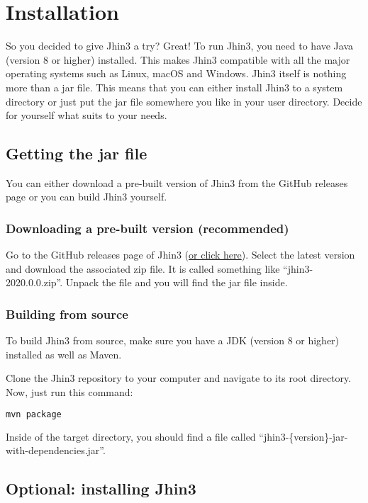 \section{Installation}

So you decided to give Jhin3 a try? Great!
To run Jhin3, you need to have Java (version 8 or higher) installed. This makes Jhin3 compatible with all the major operating systems such as Linux, macOS and Windows. Jhin3 itself is nothing more than a jar file. This means that you can either install Jhin3 to a system directory or just put the jar file somewhere you like in your user directory. Decide for yourself what suits to your needs.

\subsection{Getting the jar file}

You can either download a pre-built version of Jhin3 from the GitHub releases page or you can build Jhin3 yourself.

\subsubsection{Downloading a pre-built version (recommended)}

Go to the GitHub releases page of Jhin3 (\href{https://github.com/hannesbraun/jhin3/releases}{or click here}). Select the latest version and download the associated zip file. It is called something like ``jhin3-2020.0.0.zip''.
Unpack the file and you will find the jar file inside.

\subsubsection{Building from source}

To build Jhin3 from source, make sure you have a JDK (version 8 or higher) installed as well as Maven.

Clone the Jhin3 repository to your computer and navigate to its root directory. Now, just run this command:
\begin{lstlisting}[language=bash]
mvn package
\end{lstlisting}

Inside of the target directory, you should find a file called ``jhin3-\{version\}-jar-with-dependencies.jar''.

\subsection{Optional: installing Jhin3}

